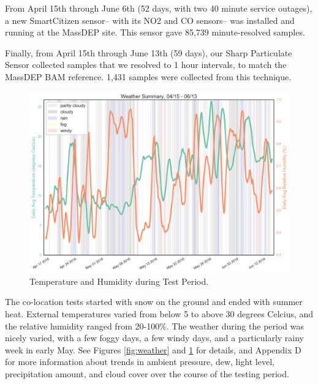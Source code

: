 From April 15th through June 6th (52 days, with two 40 minute service outages), a new SmartCitizen sensor-- with its NO2 and CO sensors-- was installed and running at the MassDEP site.  This sensor gave 85,739 minute-resolved samples.

Finally, from April 15th through June 13th (59 days), our Sharp Particulate Sensor collected samples that we resolved to 1 hour intervals, to match the MassDEP BAM reference.  1,431 samples were collected from this technique.  

\FloatBarrier
\begin{figure}[htb]
 	\includegraphics[width=\textwidth]{figs/weather_summary}               
 	\caption{Temperature and Humidity during Test Period.}
  	\label{fig:weather_summary}
\end{figure}
\FloatBarrier

The co-location tests started with snow on the ground and ended with summer heat.  External temperatures varied from below 5 to above 30 degrees Celcius, and the relative humidity ranged from 20-100\%.  The weather during the period was nicely varied, with a few foggy days, a few windy days, and a particularly rainy week in early May.  See Figures \ref{fig:weather} and \ref{fig:weather_summary} for details, and Appendix D for more information about trends in ambient pressure, dew, light level, precipitation amount, and cloud cover over the course of the testing period.   